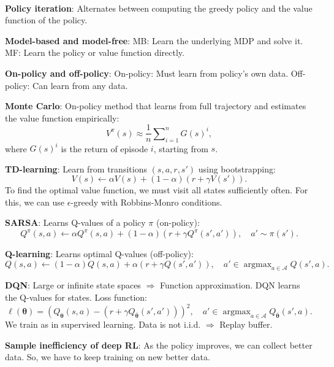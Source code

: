\documentclass{article}
\DeclareMathOperator*{\argmax}{argmax}
\renewcommand{\vec}[1]{\bm{#1}}
\newenvironment{topic}[1]
{\textbf{\sffamily \colorbox{black}{\rlap{\textbf{\textcolor{white}{#1}}}\hspace{\linewidth}\hspace{-2\fboxsep}}} \\ \vspace{0.2cm}}
{}
\begin{document}
\begin{multicols*}{2}
\begin{topic}{Reinforcement learning}
        \textbf{Policy iteration}: Alternates between computing the greedy policy and the value
        function of the policy.

        \textbf{Model-based and model-free}: MB: Learn the underlying MDP and solve it.
        MF: Learn the policy or value function directly.

        \textbf{On-policy and off-policy}: On-policy: Must learn from policy's own data. Off-policy:
        Can learn from any data.

        \textbf{Monte Carlo}: On-policy method that learns from full trajectory and estimates the value function empirically: \[
            V^\pi(s) \approx \frac{1}{n} \sum\nolimits_{i=1}^{n} G(s)^i,
        \]
        where $G(s)^i$ is the return of episode $i$, starting from $s$.

        \textbf{TD-learning}: Learn from transitions $(s, a, r, s')$ using bootstrapping: \[
            V(s) \gets \alpha V(s) + (1- \alpha) (r + \gamma V(s')).
        \]
        To find the optimal value function, we must visit all states sufficiently often. For this, we can
        use $\epsilon$-greedy with Robbins-Monro conditions.

        \textbf{SARSA}: Learns Q-values of a policy $\pi$ (on-policy): \[
            Q^\pi(s,a) \gets \alpha Q^\pi(s,a) + (1-\alpha) (r + \gamma Q^\pi(s', a')), \quad a' \sim \pi(s').
        \]

        \textbf{Q-learning}: Learns optimal Q-values (off-policy): \[
            Q(s,a) \gets (1-\alpha) Q(s,a) + \alpha (r + \gamma Q(s',a')), \quad a' \in \argmax\nolimits_{a \in \mathcal{A}} Q(s', a).
        \]

        \textbf{DQN}: Large or infinite state spaces $\Rightarrow$ Function approximation. DQN learns
        the Q-values for states. Loss function: \[
            \ell(\vec{\theta}) = (Q_{\vec{\theta}}(s,a) - (r + \gamma Q_{\bar{\vec{\theta}}}(s', a')))^2, \quad a' \in \argmax\nolimits_{a \in \mathcal{A}} Q_{\bar{\vec{\theta}}}(s', a).
        \]
        We train as in supervised learning. Data is not i.i.d. $\Rightarrow$ Replay buffer.

        \textbf{Sample inefficiency of deep RL}: As the policy improves, we can collect better data.
        So, we have to keep training on new better data.


\end{topic}
\end{multicols*}
\end{document}
